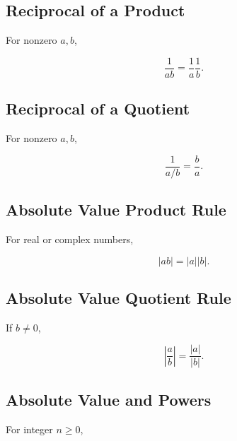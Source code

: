 \subsection{Reciprocal of a Product}
\label{subsec:reciprocal-product}

For nonzero \(a,b\),

\[
\boxed{
\frac{1}{ab}
=
\frac1a\frac1b.
}
\]

\subsection{Reciprocal of a Quotient}
\label{subsec:reciprocal-quotient}

For nonzero \(a,b\),

\[
\boxed{
\frac{1}{a/b}
=
\frac{b}{a}.
}
\]

\subsection{Absolute Value Product Rule}
\label{subsec:absolute-value-product}

For real or complex numbers,

\[
\boxed{
|ab|
=
|a||b|.
}
\]

\subsection{Absolute Value Quotient Rule}
\label{subsec:absolute-value-quotient}

If \(b\neq0\),

\[
\boxed{
\left|
\frac{a}{b}
\right|
=
\frac{|a|}{|b|}.
}
\]

\subsection{Absolute Value and Powers}
\label{subsec:absolute-value-powers}

For integer \(n\geq0\),

